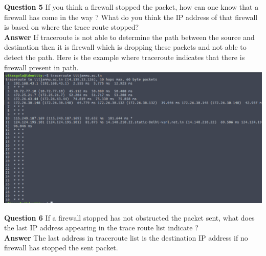 \documentclass[14pt]{extarticle}
\begin{document}
    \noindent
    \textbf{\large Question 5}
    If you think a firewall stopped the packet, how can one know that a firewall has come in the way ? What
do you think the IP address of that firewall is based on where the trace route stopped?\\[10pt]
    \textbf{\large Answer}
    If traceroute is not able to determine the path between the source and destination then it is firewall which is dropping these packets and not able to detect the path.
    Here is the example where traceroute indicates that there is firewall present in path.
    \\
    \includegraphics[scale=0.4]{5}
    \vspace{1cm}

    \noindent
    \textbf{\large Question 6}
    If a firewall stopped has not obstructed the packet sent, what does the last IP address appearing in the
trace route list indicate ?\\[10pt]
    \textbf{\large Answer}
    The last address in traceroute list is the destination IP address if no firewall has stopped the sent packet.
    \vspace{1cm}
\end{document}
